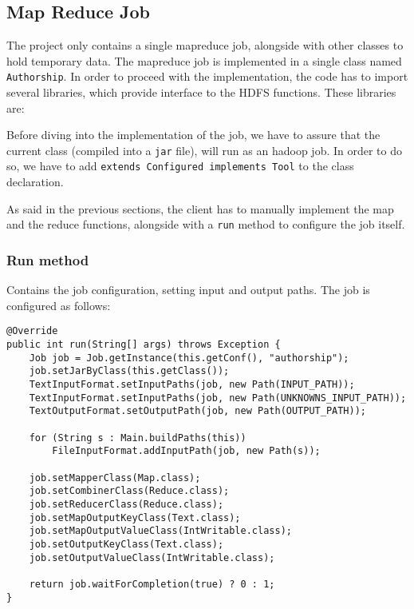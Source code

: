 \documentclass[a4paper,11pt, twoside]{article}
\begin{document}
	\subsection{Map Reduce Job}
	The project only contains a single mapreduce job, alongside with other classes to hold temporary data. The mapreduce job is implemented in a single class named \lstinline|Authorship|. In order to proceed with the implementation, the code has to import several libraries, which provide interface to the HDFS functions. These libraries are:
	\begin{figure}[H]
	\end{figure}

	Before diving into the implementation of the job, we have to assure that the current class (compiled into a \verb|jar| file), will run as an hadoop job. In order to do so, we have to add \lstinline|extends Configured implements Tool| to the class declaration.
	
	\bigskip
	\noindent
	As said in the previous sections, the client has to manually implement the map and the reduce functions, alongside with a \lstinline|run| method to configure the job itself.

	\subsubsection{Run method}
	Contains the job configuration, setting input and output paths.
	The job is configured as follows:
	
	\begin{lstlisting}[firstnumber=48, caption={Run method}, captionpos=b]
@Override
public int run(String[] args) throws Exception {
	Job job = Job.getInstance(this.getConf(), "authorship");
	job.setJarByClass(this.getClass());
	TextInputFormat.setInputPaths(job, new Path(INPUT_PATH));
	TextInputFormat.setInputPaths(job, new Path(UNKNOWNS_INPUT_PATH));
	TextOutputFormat.setOutputPath(job, new Path(OUTPUT_PATH));
	
	for (String s : Main.buildPaths(this))
		FileInputFormat.addInputPath(job, new Path(s));
	
	job.setMapperClass(Map.class);
	job.setCombinerClass(Reduce.class);
	job.setReducerClass(Reduce.class);
	job.setMapOutputKeyClass(Text.class);
	job.setMapOutputValueClass(IntWritable.class);
	job.setOutputKeyClass(Text.class);
	job.setOutputValueClass(IntWritable.class);
	
	return job.waitForCompletion(true) ? 0 : 1;
}
	\end{lstlisting}
	
\end{document}
